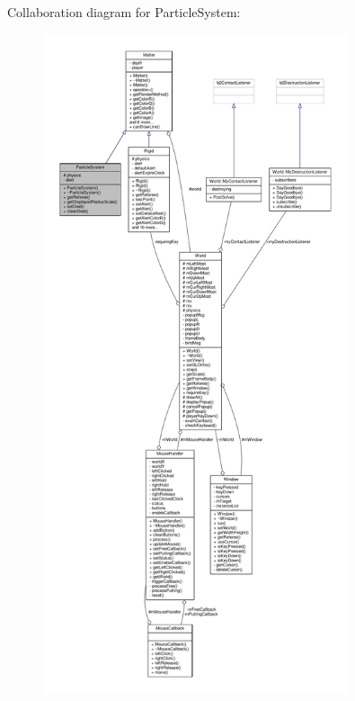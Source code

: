 Collaboration diagram for Particle\+System\+:
\nopagebreak
\begin{figure}[H]
\begin{center}
\leavevmode
\includegraphics[height=550pt]{classParticleSystem__coll__graph}
\end{center}
\end{figure}
